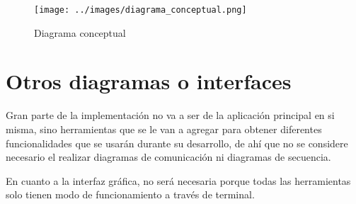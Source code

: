 \begin{figure}[!ht]
  \begin{center}
  \texttt{[image: ../images/diagrama\_conceptual.png]}
  \caption{Diagrama conceptual}
  \label{fig:diagrama_conceptual}
  \end{center}
\end{figure}

\section{Otros diagramas o interfaces}

Gran parte de la implementación no va a ser de la aplicación principal en si misma, sino herramientas que se le van a agregar para obtener diferentes funcionalidades que se usarán durante su desarrollo, de ahí que no se considere necesario el realizar diagramas de comunicación ni diagramas de secuencia.

\bigskip
En cuanto a la interfaz gráfica, no será necesaria porque todas las herramientas solo tienen modo de funcionamiento a través de terminal.